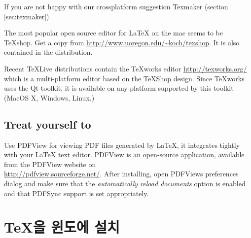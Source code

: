 If you are not happy with our crossplatform suggestion Texmaker (section \ref{sec:texmaker}).
 
The most popular open source editor for \LaTeX{} on the mac seems to be
\TeX{}shop.  Get a copy from \url{http://www.uoregon.edu/~koch/texshop}. It
is also contained in the  distribution.

Recent \TeX Live distributions contain the \TeX{}works editor 
\url{http://texworks.org/} which is a multi-platform editor based on the \TeX{}Shop
design. Since \TeX{}works uses the Qt toolkit, it is available on any platform
supported by this toolkit (MacOS X, Windows, Linux.) 

\subsection{Treat yourself to }

Use PDFView for viewing PDF files generated by \LaTeX{}, it integrates tightly
with your \LaTeX{} text editor. PDFView is an open-source application, available from the PDFView website on\\
\url{http://pdfview.sourceforge.net/}. After installing, open
PDFViews preferences dialog and make sure that the \emph{automatically reload
documents} option is enabled and that PDFSync support is set appropriately.

\section{\TeX{}을 윈도에 설치}

